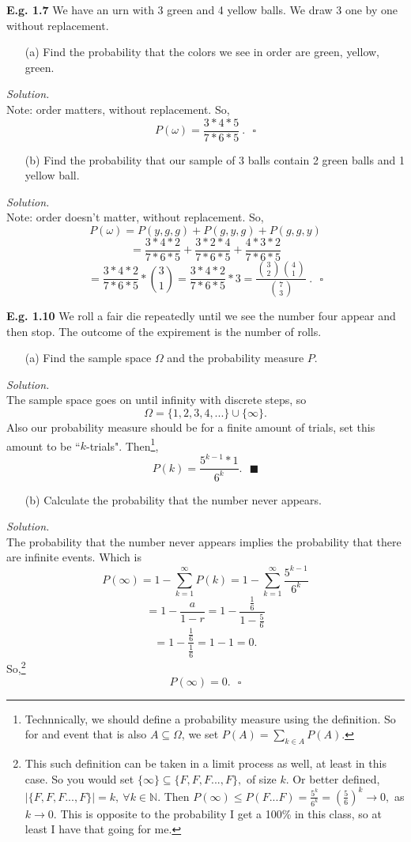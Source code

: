 \documentclass[12pt]{book}
\begin{document}
\noindent \textbf{E.g. 1.7} We have an urn with 3 green and 4 yellow balls. We draw 3 one by one without replacement.
\begin{itemize}\item [(a)] Find the probability that the colors we see in order are green, yellow, green.\end{itemize}
\textit{Solution.} \\
Note: order matters, without replacement. So,
$$P(\omega) = \frac{3*4*5}{7*6*5}~.~~~\square$$
\begin{itemize}\item [(b)] Find the probability that our sample of 3 balls contain 2 green balls and 1 yellow ball.\end{itemize}
\textit{Solution.} \\
Note: order doesn't matter, without replacement. So,
$$P(\omega) = P (y,g,g) + P (g,y,g) + P(g,g,y)$$
$$=\frac{3*4*2}{7*6*5} + \frac{3*2*4}{7*6*5} + \frac{4*3*2}{7*6*5}$$
$$=\frac{3*4*2}{7*6*5} * {3 \choose 1} = \frac{3*4*2}{7*6*5} * 3 = \dfrac{{3\choose 2}{4\choose 1}}{{7\choose3}}~.~~~\square$$

\noindent \textbf{E.g. 1.10} We roll a fair die repeatedly until we see the number four appear and then stop. The outcome of the expirement is the number of rolls.
\begin{itemize}\item [(a)] Find the sample space $\Omega$ and the probability measure $P$. \end{itemize}
\textit{Solution.} \\
The sample space goes on until infinity with discrete steps, so
$$ \Omega = \big\{ 1,2,3,4,... \big\} \cup \big\{ \infty \big\}.$$
Also our probability measure should be for a finite amount of trials, set this amount to be ``$k$-trials". Then\footnote{Technnically, we should define a probability measure using the definition. So for and event that is also $A\subseteq \Omega$, we set $P(A)=\sum\limits_{k\in A} P(A)$.},
$$ P(k) = \frac{5^{k-1}*1}{6^k}.~~~\blacksquare$$
\begin{itemize}\item [(b)] Calculate the probability that the number never appears.\end{itemize}
\textit{Solution.} \\
The probability that the number never appears implies the probability that there are infinite events.
Which is
$$P(\infty)=1-\sum\limits_{k=1}^{\infty} P(k) = 1- \sum\limits_{k=1}^{\infty} \frac{5^{k-1}}{6^k}$$
$$ = 1-\frac{a}{1-r} = 1-\frac{\frac{1}{6}}{1-\frac{5}{6}}$$
$$ = 1-\frac{\frac{1}{6}}{\frac{1}{6}} = 1-1 = 0.$$
So,\footnote{This such definition can be taken in a limit process as well, at least in this case. So you would set $\{\infty \} \subseteq \{F,F,F...,F\},$ of size $k$. Or better defined, $|\{F,F,F...,F\}|=k,~\forall k\in \mathbb{N}$. Then $P(\infty) \leq P(F...F) = \frac{5^k}{6^k} = \left( \frac{5}{6} \right)^k \rightarrow 0,$ as $k\rightarrow 0$. This is opposite to the probability I get a 100\% in this class, so at least I have that going for me.}
$$P(\infty) = 0.~~~\square$$
\end{document}
